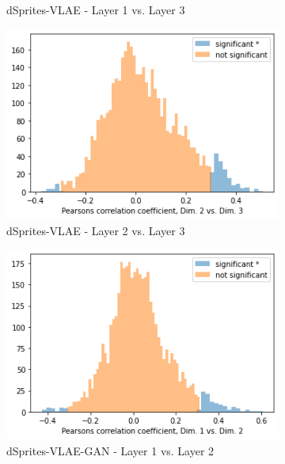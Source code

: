 \begin{figure}
\begin{subfigure}{.3\textwidth}
        \caption{dSprites-VLAE - Layer 1 vs. Layer 3}
    \end{subfigure}
    \hfill
    \begin{subfigure}{.3\textwidth}
        \includegraphics[width=\textwidth]{images/notprop/dsprites/vlae/dim_2_3.png}
        \caption{dSprites-VLAE - Layer 2 vs. Layer 3}
    \end{subfigure}
    \begin{subfigure}{.3\textwidth}
        \includegraphics[width=\textwidth]{images/notprop/dsprites/vlae_gan/dim_1_2.png}
        \caption{dSprites-VLAE-GAN - Layer 1 vs. Layer 2}
    \end{subfigure}
    \hfill
    \begin{subfigure}{.3\textwidth}

\end{subfigure}
\end{figure}
